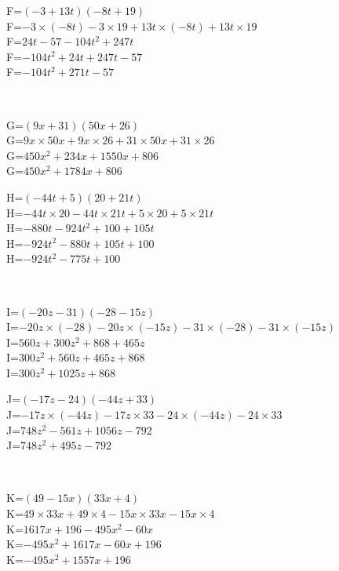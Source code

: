 \documentclass{article}%
\begin{document}
\begin{minipage}{0.5\textwidth}%
F=$(-3+13t)(-8t+19)$\\%
F=$-3 \times (-8t)-3 \times 19+13t \times (-8t)+13t \times 19$\\%
F=$24t-57-104t^2+247t$\\%
F=$-104t^2+24t+247t-57$\\%
F=$-104t^2+271t-57$\\%
\end{minipage}%
\\%
\begin{minipage}{0.5\textwidth}%
G=$(9x+31)(50x+26)$\\%
G=$9x \times 50x+9x \times 26+31 \times 50x+31 \times 26$\\%
G=$450x^2+234x+1550x+806$\\%
G=$450x^2+1784x+806$\\%
\end{minipage}%
\begin{minipage}{0.5\textwidth}%
H=$(-44t+5)(20+21t)$\\%
H=$-44t \times 20-44t \times 21t+5 \times 20+5 \times 21t$\\%
H=$-880t-924t^2+100+105t$\\%
H=$-924t^2-880t+105t+100$\\%
H=$-924t^2-775t+100$\\%
\end{minipage}%
\\%
\begin{minipage}{0.5\textwidth}%
I=$(-20z-31)(-28-15z)$\\%
I=$-20z \times (-28)-20z \times (-15z)-31 \times (-28)-31 \times (-15z)$\\%
I=$560z+300z^2+868+465z$\\%
I=$300z^2+560z+465z+868$\\%
I=$300z^2+1025z+868$\\%
\end{minipage}%
\begin{minipage}{0.5\textwidth}%
J=$(-17z-24)(-44z+33)$\\%
J=$-17z \times (-44z)-17z \times 33-24 \times (-44z)-24 \times 33$\\%
J=$748z^2-561z+1056z-792$\\%
J=$748z^2+495z-792$\\%
\end{minipage}%
\\%
\begin{minipage}{0.5\textwidth}%
K=$(49-15x)(33x+4)$\\%
K=$49 \times 33x+49 \times 4-15x \times 33x-15x \times 4$\\%
K=$1617x+196-495x^2-60x$\\%
K=$-495x^2+1617x-60x+196$\\%
K=$-495x^2+1557x+196$\\%
\end{minipage}%
\end{document}

